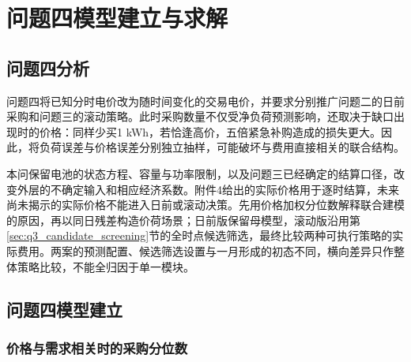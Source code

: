 \section{问题四模型建立与求解}
\label{sec:question4}

\subsection{问题四分析}

问题四将已知分时电价改为随时间变化的交易电价，并要求分别推广问题二的日前采购和问题三的滚动策略。此时采购数量不仅受净负荷预测影响，还取决于缺口出现时的价格：同样少买1 kWh，若恰逢高价，五倍紧急补购造成的损失更大。因此，将负荷误差与价格误差分别独立抽样，可能破坏与费用直接相关的联合结构。

本问保留电池的状态方程、容量与功率限制，以及问题三已经确定的结算口径，改变外层的不确定输入和相应经济系数。附件4给出的实际价格用于逐时结算，未来尚未揭示的实际价格不能进入日前或滚动决策。先用价格加权分位数解释联合建模的原因，再以同日残差构造价荷场景；日前版保留母模型，滚动版沿用第\ref{sec:q3_candidate_screening}节的全时点候选筛选，最终比较两种可执行策略的实际费用。两案的预测配置、候选筛选设置与一月形成的初态不同，横向差异只作整体策略比较，不能全归因于单一模块。

\subsection{问题四模型建立}

\subsubsection{价格与需求相关时的采购分位数}

